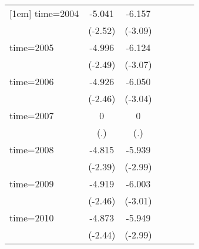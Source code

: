 \begin{table}[htbp]
\begin{tabular}{l*{6}{c}}
[1em]
time=2004           &      -5.041\sym{**} &      -6.157\sym{***}&                     &                     &                     &                     \\
                    &     (-2.52)         &     (-3.09)         &                     &                     &                     &                     \\
[1em]
time=2005           &      -4.996\sym{**} &      -6.124\sym{***}&                     &                     &                     &                     \\
                    &     (-2.49)         &     (-3.07)         &                     &                     &                     &                     \\
[1em]
time=2006           &      -4.926\sym{**} &      -6.050\sym{***}&                     &                     &                     &                     \\
                    &     (-2.46)         &     (-3.04)         &                     &                     &                     &                     \\
[1em]
time=2007           &           0         &           0         &                     &                     &                     &                     \\
                    &         (.)         &         (.)         &                     &                     &                     &                     \\
[1em]
time=2008           &      -4.815\sym{**} &      -5.939\sym{***}&                     &                     &                     &                     \\
                    &     (-2.39)         &     (-2.99)         &                     &                     &                     &                     \\
[1em]
time=2009           &      -4.919\sym{**} &      -6.003\sym{***}&                     &                     &                     &                     \\
                    &     (-2.46)         &     (-3.01)         &                     &                     &                     &                     \\
[1em]
time=2010           &      -4.873\sym{**} &      -5.949\sym{***}&                     &                     &                     &                     \\
                    &     (-2.44)         &     (-2.99)         &                     &                     &                     &                     \\

\end{tabular}
\end{table}
